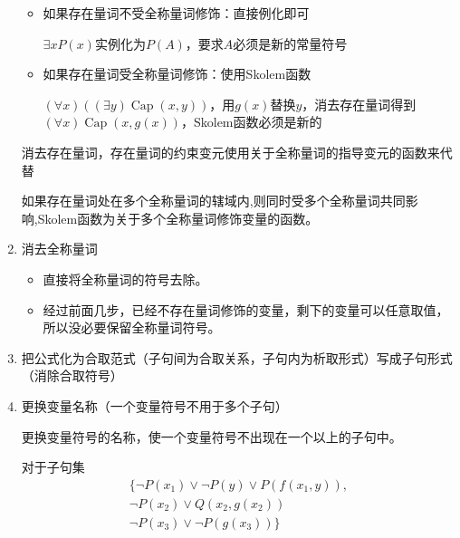 \begin{note}
\begin{enumerate}
        \begin{itemize}
            \item 如果存在量词不受全称量词修饰：直接例化即可
            
            $\exists xP(x)$实例化为$P(A)$，要求$A$必须是新的常量符号
            \item 如果存在量词受全称量词修饰：使用Skolem函数
            
            $\left( \forall x \right)\left( \left( \exists y \right)\operatorname{Cap}(x,y) \right)$，用$g(x)$替换$y$，消去存在量词得到$\left( \forall x \right)\operatorname{Cap}(x,g(x))$，Skolem函数必须是新的
        \end{itemize}

        消去存在量词，\textcolor{main1}{存在量词}的\textcolor{main1}{约束变元}使用关于\textcolor{main1}{全称量词}的\textcolor{main1}{指导变元的函数}来代替

        如果存在量词处在多个全称量词的辖域内,则同时受多个全称量词共同影响,Skolem函数为关于多个全称量词修饰变量的函数。
        \item \textcolor{main1}{消去全称量词}
        \begin{itemize}
            \item 直接将全称量词的符号去除。
            \item 经过前面几步，已经不存在量词修饰的变量，剩下的变量可以任意取值，所以没必要保留全称量词符号。
        \end{itemize}

        \item 把公式化为合取范式（子句间为合取关系，子句内为析取形式）写成子句形式（消除合取符号）
        \item \textcolor{main1}{更换变量名称（一个变量符号不用于多个子句）}
        
        更换变量符号的名称，使一个变量符号不出现在一个以上的子句中。

        对于子句集
        \[
            \begin{array}{l}
                \{ \lnot P(x_1)\lor \lnot P(y)\lor P(f(x_1,y)),\\
                    \lnot P(x_2)\lor Q(x_2,g(x_2))\\
                    \lnot P(x_3)\lor \lnot P(g(x_3))\}
            \end{array}
        \]
    \end{enumerate}
\end{note}
